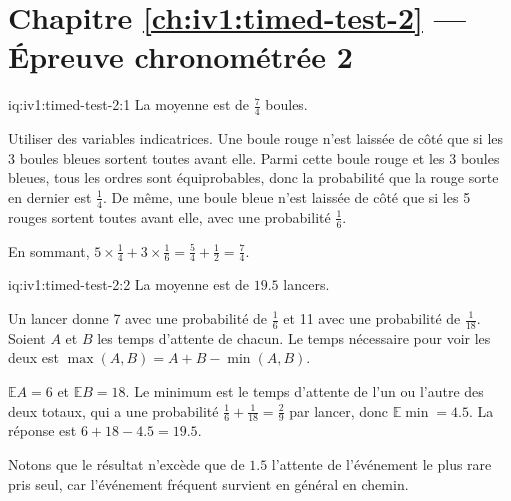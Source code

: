 \section*{Chapitre \ref{ch:iv1:timed-test-2} --- Épreuve chronométrée 2}

\begin{solution}{iq:iv1:timed-test-2:1}
La moyenne est de $\frac74$ boules.

Utiliser des variables indicatrices. Une boule rouge n'est laissée de côté que si les 3 boules bleues sortent toutes avant elle. Parmi cette boule rouge et les 3 boules bleues, tous les ordres sont équiprobables, donc la probabilité que la rouge sorte en dernier est $\frac14$. De même, une boule bleue n'est laissée de côté que si les 5 rouges sortent toutes avant elle, avec une probabilité $\frac16$.

En sommant, $5 \times \frac14 + 3 \times \frac16 = \frac54 + \frac12 = \frac74$.

\end{solution}

\begin{solution}{iq:iv1:timed-test-2:2}
La moyenne est de $19.5$ lancers.

Un lancer donne 7 avec une probabilité de $\frac16$ et 11 avec une probabilité de $\frac{1}{18}$. Soient $A$ et $B$ les temps d'attente de chacun. Le temps nécessaire pour voir les deux est $\max(A, B) = A + B - \min(A, B)$.

$\mathbb{E}A = 6$ et $\mathbb{E}B = 18$. Le minimum est le temps d'attente de l'un ou l'autre des deux totaux, qui a une probabilité $\frac16 + \frac{1}{18} = \frac29$ par lancer, donc $\mathbb{E}\min = 4.5$. La réponse est $6 + 18 - 4.5 = 19.5$.

Notons que le résultat n'excède que de $1.5$ l'attente de l'événement le plus rare pris seul, car l'événement fréquent survient en général en chemin.

\end{solution}

